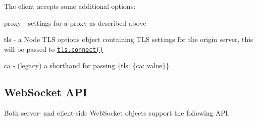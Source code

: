 The client accepts some additional options\+:


\begin{DoxyItemize}
\item {\ttfamily proxy} -\/ settings for a proxy as described above
\item {\ttfamily tls} -\/ a Node \textquotesingle{}T\+LS options\textquotesingle{} object containing T\+LS settings for the origin server, this will be passed to \href{http://nodejs.org/api/tls.html#tls_tls_connect_options_callback}{\tt {\ttfamily tls.\+connect()}}
\item {\ttfamily ca} -\/ (legacy) a shorthand for passing {\ttfamily \{tls\+: \{ca\+: value\}\}}
\end{DoxyItemize}

\subsection*{Web\+Socket A\+PI}

Both server-\/ and client-\/side {\ttfamily Web\+Socket} objects support the following A\+PI.


